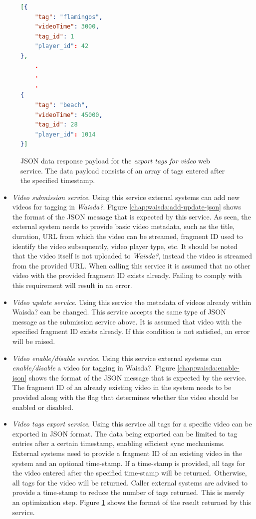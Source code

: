 \begin{figure}
\centering
\begin{lstlisting}[language=json,firstnumber=1]
[{
	"tag": "flamingos",
	"videoTime": 3000,
	"tag_id": 1
	"player_id": 42
},
	.
	.
	.
{
	"tag": "beach",
	"videoTime": 45000,
	"tag_id": 28
	"player_id": 1014
}]
\end{lstlisting}
\caption{JSON data response payload for the \textit{export tags for video} web service. The data payload consists of an array of tags entered after the specified timestamp.}
\label{chap:waisda:export-json-result}
\end{figure}

\begin{itemize}
\item \textit{Video submission service}. Using this service external systems can add new videos for tagging in \textit{Waisda?}. Figure \ref{chap:waisda:add-update-json} shows the format of the JSON message that is expected by this service. As seen, the external system needs to provide basic video metadata, such as the title, duration, URL from which the video can be streamed, fragment ID used to identify the video subsequently, video player type, etc. It should be noted that the video itself is not uploaded to \textit{Waisda?}, instead the video is streamed from the provided URL. When calling this service it is assumed that no other video with the provided fragment ID exists already. Failing to comply with this requirement will result in an error.

\item \textit{Video update service}. Using this service the metadata of videos already within Waisda? can be changed. This service accepts the same type of JSON message as the submission service above. It is assumed that video with the specified fragment ID exists already. If this condition is not satisfied, an error will be raised.

\item \textit{Video enable/disable service}. Using this service external systems can \textit{enable/disable} a video for tagging in Waisda?. Figure \ref{chap:waisda:enable-json} shows the format of the JSON message that is expected by the service. The fragment ID of an already existing video in the system needs to be provided along with the flag that determines whether the video should be enabled or disabled.

\item \textit{Video tags export service}. Using this service all tags for a specific video can be exported in JSON format. The data being exported can be limited to tag entries after a certain timestamp, enabling efficient sync mechanisms. External systems need to provide a fragment ID of an existing video in the system and an optional time-stamp. If a time-stamp is provided, all tags for the video entered after the specified time-stamp will be returned. Otherwise, all tags for the video will be returned. Caller external systems are advised to provide a time-stamp to reduce the number of tags returned. This is merely an optimization step. Figure \ref{chap:waisda:export-json-result} shows the format of the result returned by this service.
\end{itemize}

